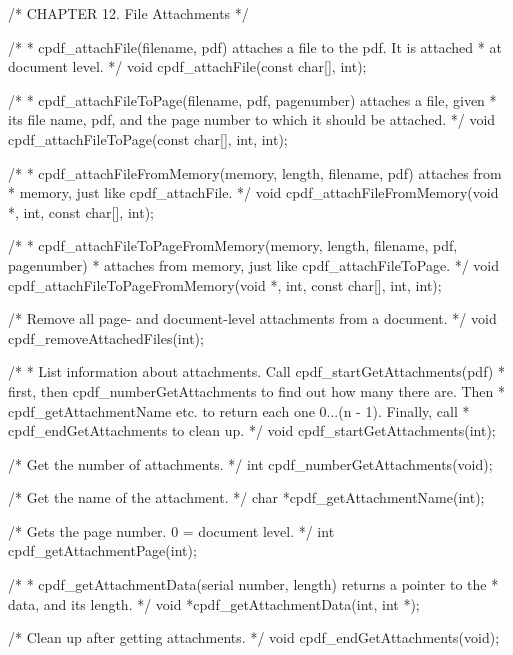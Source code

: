 /* CHAPTER 12. File Attachments */

/*
 * cpdf_attachFile(filename, pdf) attaches a file to the pdf. It is attached
 * at document level.
 */
void cpdf_attachFile(const char[], int);

/*
 * cpdf_attachFileToPage(filename, pdf, pagenumber) attaches a file, given
 * its file name, pdf, and the page number to which it should be attached.
 */
void cpdf_attachFileToPage(const char[], int, int);

/*
 * cpdf_attachFileFromMemory(memory, length, filename, pdf) attaches from
 * memory, just like cpdf_attachFile.
 */
void cpdf_attachFileFromMemory(void *, int, const char[], int);

/*
 * cpdf_attachFileToPageFromMemory(memory, length, filename, pdf, pagenumber)
 * attaches from memory, just like cpdf_attachFileToPage.
 */
void cpdf_attachFileToPageFromMemory(void *, int, const char[], int, int);

/* Remove all page- and document-level attachments from a document. */
void cpdf_removeAttachedFiles(int);

/*
 * List information about attachments. Call cpdf_startGetAttachments(pdf)
 * first, then cpdf_numberGetAttachments to find out how many there are. Then
 * cpdf_getAttachmentName etc. to return each one 0...(n - 1). Finally, call
 * cpdf_endGetAttachments to clean up.
 */
void cpdf_startGetAttachments(int);

/* Get the number of attachments. */
int cpdf_numberGetAttachments(void);

/* Get the name of the attachment. */
char *cpdf_getAttachmentName(int);

/* Gets the page number. 0 = document level. */
int cpdf_getAttachmentPage(int);

/*
 * cpdf_getAttachmentData(serial number, length) returns a pointer to the
 * data, and its length.
 */
void *cpdf_getAttachmentData(int, int *);

/* Clean up after getting attachments. */
void cpdf_endGetAttachments(void);

